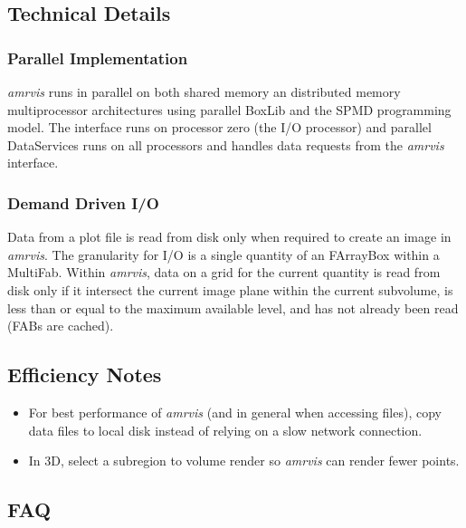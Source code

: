 \subsection{Technical Details}

\subsubsection{Parallel Implementation}

{\em amrvis} runs in parallel on both shared memory an distributed
memory multiprocessor architectures using parallel BoxLib and the
SPMD programming model.  The interface runs on processor zero
(the I/O processor) and parallel DataServices runs on all processors
and handles data requests from the {\em amrvis} interface.



\subsubsection{Demand Driven I/O}

Data from a plot file is read from disk only when required to create
an image in {\em amrvis}.  The granularity for I/O is a single quantity
of an FArrayBox within a MultiFab.  Within {\em amrvis}, data on a grid for the
current quantity is read from disk only if it intersect the current
image plane within the current subvolume, is less than or equal to the
maximum available level, and has not already been read (FABs are cached).


\subsection{Efficiency Notes}

\begin{itemize}
\item For best performance of {\em amrvis} (and in general when
accessing files), copy data files to local disk instead
of relying on a slow network connection.

\item In 3D, select a subregion to volume render so
{\em amrvis} can render fewer points.

\end{itemize}


\subsection{FAQ}

